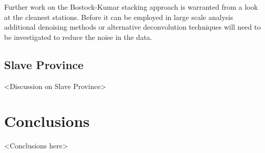 \documentclass[draft, 12pt]{article}
\begin{document}
  Further work on the Bostock-Kumar stacking approach is warranted from a look at the cleanest stations. Before it can be employed in large scale analysis additional denoising methods or alternative deconvolution techniques will need to be investigated to reduce the noise in the data.


\subsection{Slave Province}
<Discussion on Slave Province>

\section{Conclusions}
<Conclusions here>




\begin{thebibliography}{}


\end{thebibliography}





%

\end{document}
